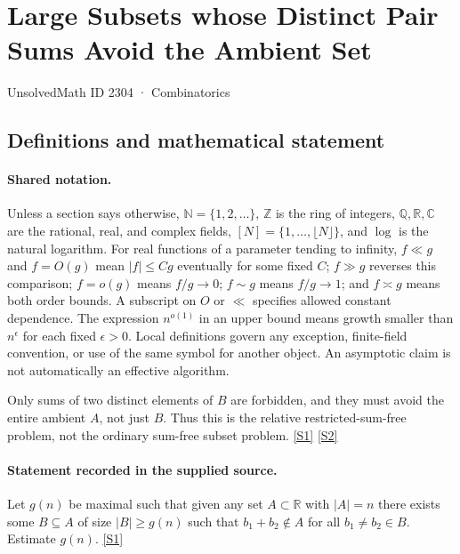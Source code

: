 \documentclass[11pt,a4paper]{article}
\newcommand{\N}{\mathbb{N}}
\newcommand{\Z}{\mathbb{Z}}
\newcommand{\Q}{\mathbb{Q}}
\newcommand{\R}{\mathbb{R}}
\newcommand{\C}{\mathbb{C}}
\newcommand{\sref}[2]{\hyperlink{source:#1:#2}{[S#2]}}
\begin{document}

\setcounter{section}{2303}

\section{Large Subsets whose Distinct Pair Sums Avoid the Ambient Set}\label{2304}

{\small\sffamily UnsolvedMath ID 2304 · Combinatorics}

\subsection{Definitions and mathematical statement}

\paragraph{Shared notation.}Unless a section says otherwise, $\N=\{1,2,\ldots\}$,
$\Z$ is the ring of integers, $\Q,\R,\C$ are the rational, real, and complex
fields, $[N]=\{1,\ldots,\lfloor N\rfloor\}$, and $\log$ is the natural
logarithm. For real functions of a parameter tending to infinity,
$f\ll g$ and $f=O(g)$ mean $|f|\leq Cg$ eventually for some fixed $C$;
$f\gg g$ reverses this comparison; $f=o(g)$ means $f/g\to0$;
$f\sim g$ means $f/g\to1$; and $f\asymp g$ means both order bounds.
A subscript on $O$ or $\ll$ specifies allowed constant dependence.
The expression $n^{o(1)}$ in an upper bound means growth smaller than
$n^\epsilon$ for each fixed $\epsilon>0$. Local definitions govern any
exception, finite-field convention, or use of the same symbol for another
object. An asymptotic claim is not automatically an effective algorithm.



Only sums of two distinct elements of $B$ are forbidden, and they must avoid the entire ambient $A$, not just $B$. Thus this is the relative restricted-sum-free problem, not the ordinary sum-free subset problem. \sref{2304}{1} \sref{2304}{2}

\paragraph{Statement recorded in the supplied source.}
Let $g(n)$ be maximal such that given any set $A\subset \mathbb{R}$ with $\lvert A\rvert=n$ there exists some $B\subseteq A$ of size $\lvert B\rvert\geq g(n)$ such that $b_1+b_2\not\in A$ for all $b_1\neq b_2\in B$.
Estimate $g(n)$. \sref{2304}{1}
\end{document}
